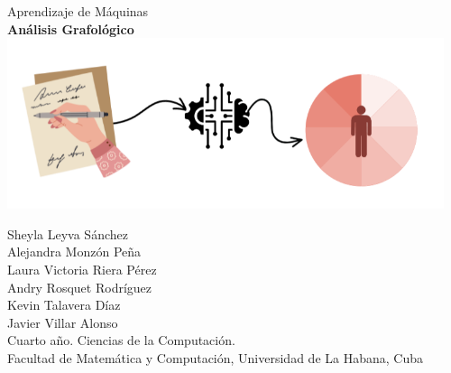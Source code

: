 \documentclass[10pt, a4paper]{article}
\begin{document}
    \begin{center}
    	\large Aprendizaje de M\'aquinas	\\
    	\huge \textbf{An\'alisis Grafol\'ogico} \\
    	
    	\includegraphics[height=5cm]{logo1.png}
    	
    	\normalsize Sheyla Leyva S\'anchez \\  Alejandra Monz\'on Pe\~na \\ Laura Victoria Riera P\'erez \\ Andry Rosquet Rodr\'iguez \\ Kevin Talavera D\'iaz \\ Javier Villar Alonso \\
    	
    	\vspace{1em}
    	\small Cuarto a\~no. Ciencias de la Computaci\'on. \\
   		\small Facultad de Matem\'atica y Computaci\'on, Universidad de La Habana, Cuba 
    \end{center}
	
	\vspace{0.05em}
	\normalsize
    \begin{abstract}
        La grafología es una técnica que estudia las características psicológicas de las personas a través de su escritura. 
        En algunos centros laborales se utilizan este tipo de análisis para determinar cuando contratar o no a alguien y se emplea también para analizar a criminales y en el proceso de determinar trastornos en personas. Esta es una tarea complicada realizada por expertos, psicólogos y grafólogos, y sus resultados están, numerosas veces, sujetos a la perspectiva de quien los analiza. 
        En este trabajo se propone utilizar algoritmos de Aprendizaje de Máquina, para automáticamente poder predecir características psicológicas de un individuo a partir de un fragmento de su escritura. 
        Con este objetivo se propone la creaci\'on de un dataset de im\'agenes de escritura a mano, as\'i como su uso para entrenar y comparar los modelos para predecir la personalidad basado en el Test de los Cinco Grandes (Big Five).
        Se implementaron los algoritmos Convolutional Neural Network (CNN), Support Vector Machine (SVM), K-Nearest Neighbours (KNN) y K-Means, estableciendo una comparaci\'on de los resultados obtenidos para el an\'alisis grafol\'ogico. 
    \end{abstract}
    
\end{document}
